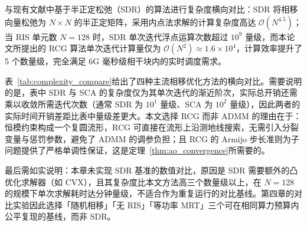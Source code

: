 与现有文献中基于半正定松弛（SDR）的算法进行复杂度横向对比：SDR 将相移向量松弛为 $N \times N$ 的半正定矩阵，采用内点法求解的计算复杂度高达 $\mathcal{O}(N^{4.5})$；当 RIS 单元数 $N=128$ 时，SDR 单次迭代浮点运算次数超过 $10^9$ 量级，而本论文所提出的 RCG 算法单次迭代计算量仅为 $\mathcal{O}(N^2) \approx 1.6 \times 10^4$，计算效率提升了 5 个数量级，完全满足 6G 毫秒级相干块内的实时调度需求。

\begin{table}[htbp]
  \centering
  \caption{不同相移优化方法的计算复杂度与可实现性对比}
  \label{tab:complexity_compare}
\end{table}

表~\ref{tab:complexity_compare}给出了四种主流相移优化方法的横向对比。需要说明的是，表中 SDR 与 SCA 的复杂度仅为其单次迭代的渐近阶次，实际总开销还需乘以收敛所需迭代次数（通常 SDR 为 $10^1$ 量级、SCA 为 $10^2$ 量级），因此两者的实际时间开销差距比表中量级差更大。本文选择 RCG 而非 ADMM 的理由在于：恒模约束构成一个复圆流形，RCG 可直接在流形上沿测地线搜索，无需引入分裂变量与惩罚参数，避免了 ADMM 的调参负担；且 RCG 的 Armijo 步长准则为子问题提供了严格单调性保证，这是定理~\ref{thm:ao_convergence}所需要的。

最后需如实说明：本章未实现 SDR 基准的数值对比，原因是 SDR 需要额外的凸优化求解器（如 CVX），且其复杂度比本文方法高三个数量级以上，在 $N = 128$ 的规模下单次求解耗时达分钟量级，不适合作为重复运行的对比基线。第四章的对比实验因此选择「随机相移」「无 RIS」「等功率 MRT」三个可在相同算力预算内公平复现的基线，而非 SDR。
